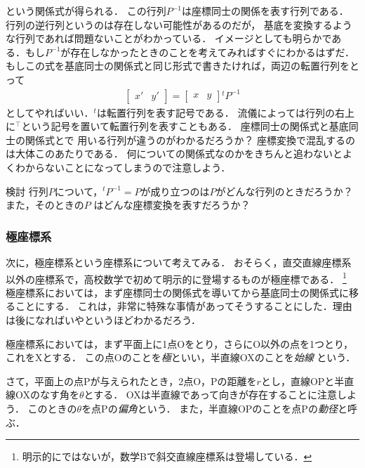 という関係式が得られる．
この行列$P^{-1}$は座標同士の関係を表す行列である．
行列の逆行列というのは存在しない可能性があるのだが，
基底を変換するような行列であれば問題ないことがわかっている．
イメージとしても明らかである．もし$P^{-1}$が存在しなかったときのことを考えてみればすぐにわかるはずだ．
もしこの式を基底同士の関係式と同じ形式で書きたければ，両辺の転置行列をとって
\begin{align*}
\left[
\begin{array}{cc}
x' & y' 
\end{array}
\right]
= 
\left[
\begin{array}{cc}
x & y 
\end{array}
\right]
{}^t\!P^{-1}
\end{align*}
としてやればいい．${}^t$は転置行列を表す記号である．
流儀によっては行列の右上に${}^\top$という記号を置いて転置行列を表すこともある．
座標同士の関係式と基底同士の関係式とで
用いる行列が違うのがわかるだろうか？ 座標変換で混乱するのは大体このあたりである．
何についての関係式なのかをきちんと追わないとよくわからないことになってしまうので注意しよう．

\begin{itembox}[l]{検討}
行列$P$について，${}^t \! P ^{-1} =P$が成り立つのは$P$がどんな行列のときだろうか？ また，そのときの$P$
はどんな座標変換を表すだろうか？ 
\end{itembox}

\subsubsection{極座標系}
次に，極座標系という座標系について考えてみる．
おそらく，直交直線座標系以外の座標系で，高校数学で初めて明示的に登場するものが極座標である．
\footnote{明示的にではないが，数学Bで斜交直線座標系は登場している．}
極座標系においては，まず座標同士の関係式を導いてから基底同士の関係式に移ることにする．
これは，非常に特殊な事情があってそうすることにした．理由は後になればいやというほどわかるだろう．

極座標系においては，まず平面上に1点Oをとり，さらにO以外の点を1つとり，これをXとする．
この点Oのことを\emph{極}といい，半直線OXのことを\emph{始線}
という．

さて，平面上の点Pが与えられたとき，2点O，Pの距離を$r$とし，直線OPと半直線OXのなす角を$\theta$とする．
OXは半直線であって向きが存在することに注意しよう．
このときの$\theta$を点Pの\emph{偏角}という．
また，半直線OPのことを点Pの\emph{動径}と呼ぶ．

